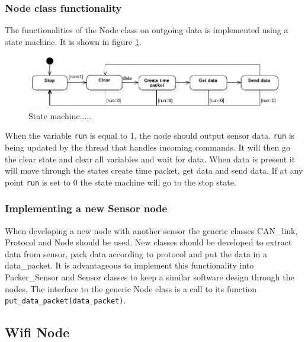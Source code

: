 \subsubsection*{Node class functionality}
The functionalities of the Node class on outgoing data is implemented using a state machine.
It is shown in figure \ref{fig:state_machine}.
\begin{figure}[!h]
\centering
\includegraphics[width=1\textwidth]{graphics/StateDiagram_Node.pdf}
\caption{State machine.....}
\label{fig:state_machine}
\end{figure}
When the variable \texttt{run} is equal to 1, the node should output sensor data.
\texttt{run} is being updated by the thread that handles incoming commands.
It will then go the clear state and clear all variables and wait for data. 
When data is present it will move through the states create time packet, get data and send data. 
If at any point \texttt{run} is set to 0 the state machine will go to the stop state.


\subsubsection*{Implementing a new Sensor node}
When developing a new node with another sensor the generic classes CAN\_link, Protocol and Node should be used. 
New classes should be developed to extract data from sensor, pack data according to protocol and put the data in a data\_packet.
It is advantageous to implement this functionality into Packer\_Sensor and Sensor classes to keep a similar software design through the nodes.
The interface to the generic Node class is a call to its function \texttt{put\_data\_packet(data\_packet)}.

\subsection{Wifi Node}

